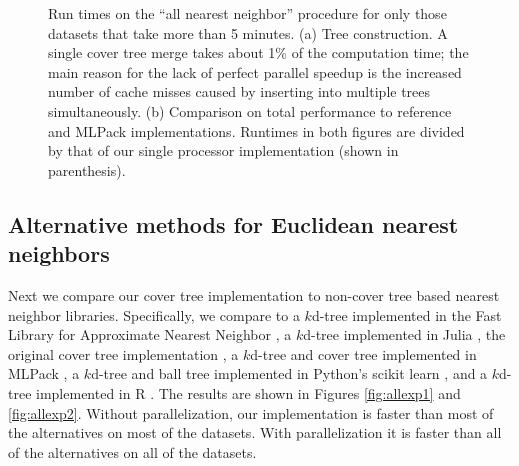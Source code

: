 \documentclass[thesis.tex]{subfiles}
\begin{document}

\begin{figure*}
\centering
\subfigure[]{\small
\resizebox{2.5in}{1.8in}{}
}
\subfigure[]{\small
\resizebox{2.5in}{1.8in}{}
}
\caption{
    Run times on the ``all nearest neighbor'' procedure for only those datasets that take more than 5 minutes.
    (a) Tree construction. %
    A single cover tree merge takes about 1\% of the computation time;
    the main reason for the lack of perfect parallel speedup is the increased number of cache misses caused by inserting into multiple trees simultaneously.
    (b) Comparison on total performance to reference and MLPack implementations. %
    Runtimes in both figures are divided by that of our single processor implementation (shown in parenthesis).
    }
\label{fig:parallel}
\end{figure*}


\subsection{Alternative methods for Euclidean nearest neighbors}

Next we compare our cover tree implementation to non-cover tree based nearest neighbor libraries.
Specifically, we compare to a $k$d-tree implemented in the Fast Library for Approximate Nearest Neighbor \citep[FLANN; ][]{muja2014scalable},
a $k$d-tree implemented in Julia \citep{bezanson2017julia},
the original cover tree implementation \citep{beygelzimer2006cover},
a $k$d-tree and cover tree implemented in MLPack \citep{curtin2013mlpack},
a $k$d-tree and ball tree implemented in Python's scikit learn \citep{scikit-learn},
and a $k$d-tree implemented in R \citep{R}.
The results are shown in Figures \ref{fig:allexp1} and \ref{fig:allexp2}.
Without parallelization, our implementation is faster than most of the alternatives on most of the datasets.
With parallelization it is faster than all of the alternatives on all of the datasets.
\end{document}
